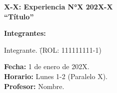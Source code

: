 \Huge\textbf{X-X: Experiencia N°X 202X-X \\}
    \vspace{0.38cm}
    \LARGE\textbf{``Título''}
    \vspace{0.5cm}
    \large
    \begin{flushleft}
        \textbf{Integrantes:}
        \begin{tabbing}
            Integrante. \hspace{2cm} \= (ROL: 111111111-1) 
        \end{tabbing}
        \vspace{0.5cm}
        \large\textbf{Fecha:} 1 de enero de 202X. \\
        \vspace{0.5cm}
        \large\textbf{Horario:} Lunes 1-2 (Paralelo X). \\
        \vspace{0.5cm}
        \large\textbf{Profesor: } Nombre. \\
    \end{flushleft}
